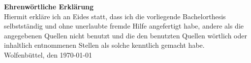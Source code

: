 

\newpage

\textbf{\Large Ehrenwörtliche Erklärung}\vspace{10mm}\\
	Hiermit erkläre ich an Eides statt, dass ich die vorliegende Bachelorthesis selbstständig und ohne unerlaubte fremde Hilfe angefertigt habe, andere als die angegebenen Quellen nicht benutzt und die den benutzten Quellen wörtlich oder inhaltlich entnommenen Stellen als solche kenntlich gemacht habe.
	\vspace{4em}\\
	Wolfenbüttel, den \today
